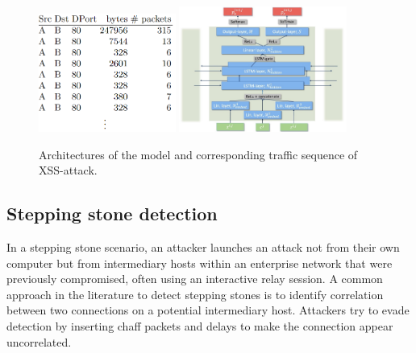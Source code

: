 \documentclass[a4paper,12pt,twoside]{article}
\begin{document}
\begin{figure}
\centering
\includegraphics[width=0.4\textwidth]{images/traffic_sequence.png}
\includegraphics[width=0.49\textwidth]{images/LSTM_design_bi2.jpg}
\caption{Architectures of the model and corresponding traffic sequence of XSS-attack.}
\label{fig:LSTM}
\end{figure}


\subsection{Stepping stone detection}\label{Sec:BTstint}


In a stepping stone scenario, an attacker launches an attack not from their own computer but from intermediary hosts within an enterprise network that were previously compromised, often using an interactive relay session. A common approach in the literature to detect stepping stones is to identify correlation between two connections on a potential intermediary host. Attackers try to evade detection by inserting chaff packets and delays to make the connection appear uncorrelated. %
\end{document}

